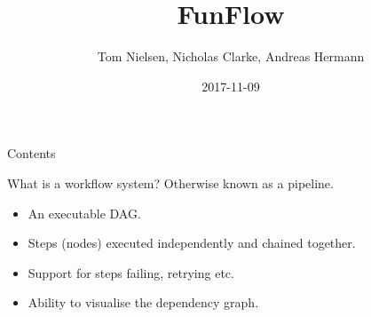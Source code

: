 \documentclass[11pt]{beamer}
\author{Tom Nielsen, Nicholas Clarke, Andreas Hermann}
\title{FunFlow}
\date{2017-11-09}
\begin{document}
\begin{frame}
\titlepage
\end{frame}

\begin{frame}{Contents}
\tableofcontents
\end{frame}

\begin{frame}{What is a workflow system?}
Otherwise known as a pipeline.
\begin{itemize}
\item An executable DAG.
\item Steps (nodes) executed independently and chained together.
\item Support for steps failing, retrying etc.
\item Ability to visualise the dependency graph.
\end{itemize}
\end{frame}
\end{document}
